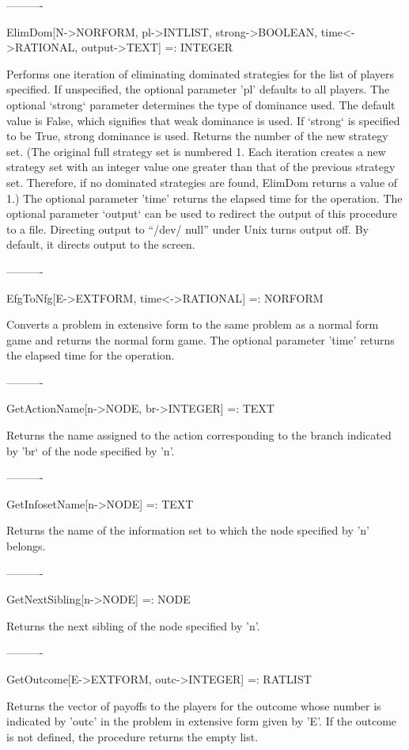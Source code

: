 ----------

ElimDom[N->NORFORM, {pl->INTLIST}, {strong->BOOLEAN}, {time<->RATIONAL},
	{output->TEXT}] =: INTEGER

	Performs one iteration of eliminating dominated strategies for the
list of players specified.  If unspecified, the optional parameter 'pl'
defaults to all players.  The optional `strong` parameter determines the 
type of dominance used.  The default value is False, which signifies that 
weak dominance is used.  If `strong` is specified to be True, strong
dominance is used.  Returns the number of the new strategy set.  (The
original full strategy set is numbered 1.  Each iteration creates a new
strategy set with an integer value one greater than that of the previous 
strategy set.  Therefore, if no dominated strategies are found, ElimDom 
returns a  value of 1.)  The optional parameter 'time' returns the elapsed
time for the operation.  The optional parameter `output` can be used to 
redirect the output of this procedure to a file.  Directing output to ``/dev/
null'' under Unix turns output off.  By default, it directs output to the 
screen.

----------

EfgToNfg[E->EXTFORM, {time<->RATIONAL}] =: NORFORM

	Converts a problem in extensive form to the same problem as a normal
form game and returns the normal form game.  The optional parameter 'time'
returns the elapsed time for the operation.

----------

GetActionName[n->NODE, br->INTEGER] =: TEXT

	Returns the name assigned to the action corresponding to the branch
indicated by 'br` of the node specified by 'n'.

----------

GetInfosetName[n->NODE] =: TEXT

	Returns the name of the information set to which the node specified by
'n' belongs.

----------

GetNextSibling[n->NODE] =: NODE

	Returns the next sibling of the node specified by 'n'.

----------

GetOutcome[E->EXTFORM, outc->INTEGER] =: RATLIST

	Returns the vector of payoffs to the players for the outcome whose
number is indicated by 'outc' in the problem in extensive form given by 'E'.
If the outcome is not defined, the procedure returns the empty list.

